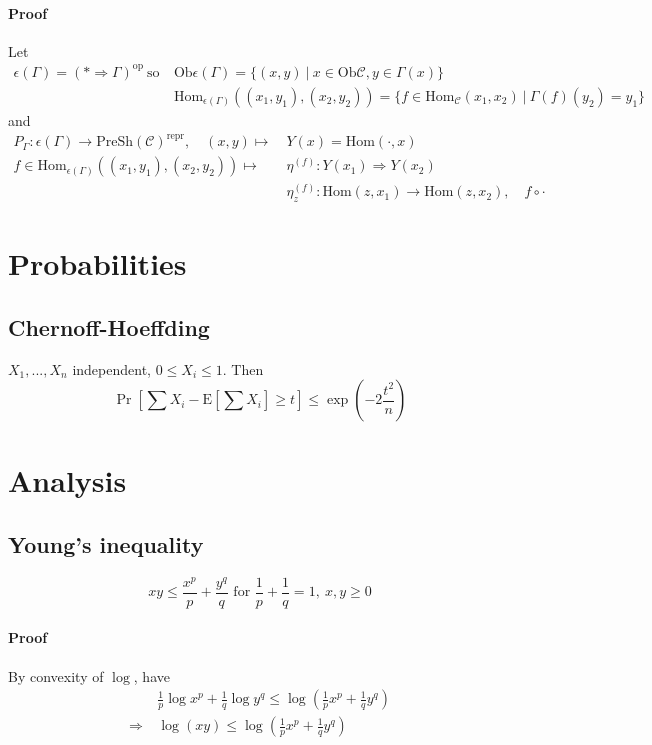 \documentclass{scrartcl}
\newcommand{\Ex}{\mathrm{E}}
\begin{document}
\paragraph{Proof} Let
\begin{align*}
    \epsilon(\Gamma) = (* \Rightarrow \Gamma)^{\mathrm{op}} \ \text{so} \ &\mathrm{Ob}\epsilon(\Gamma) = \{ (x, y) \ | \ x \in \mathrm{Ob}\mathcal{C}, y \in \Gamma(x)\} \\
    &\mathrm{Hom}_{\epsilon(\Gamma)}((x_1, y_1), (x_2, y_2)) = \{ f \in \mathrm{Hom}_{\mathcal{C}}(x_1, x_2) \ | \ \Gamma(f)(y_2) = y_1 \}
\end{align*}
and
\begin{align*}
    P_\Gamma: \epsilon(\Gamma) \to \mathrm{PreSh}(\mathcal{C})^{\mathrm{repr}}, \quad (x, y) \mapsto \ &Y(x) = \mathrm{Hom}(\cdot, x) \\
    f \in \mathrm{Hom}_{\epsilon(\Gamma)}((x_1, y_1), (x_2, y_2)) \mapsto \ &\eta^{(f)}: Y(x_1) \Rightarrow Y(x_2) \\
    &\eta^{(f)}_z: \mathrm{Hom}(z, x_1) \to \mathrm{Hom}(z, x_2), \quad f \circ \cdot
\end{align*}

\section{Probabilities}

\subsection{Chernoff-Hoeffding}
$X_1, ..., X_n$ independent, $0 \leq X_i \leq 1$. Then
\begin{equation}
    \Pr\left[\sum X_i - \Ex\left[\sum X_i\right] \geq t\right] \leq \exp\left(-2\frac {t^2} n\right) \nonumber
\end{equation}

\section{Analysis}

\subsection{Young's inequality}
\begin{equation}
    xy \leq \frac {x^p} p + \frac {y^q} q \text{ for } \frac 1 p + \frac 1 q = 1, \ x, y \geq 0 \nonumber
\end{equation}
\paragraph{Proof} By convexity of $\log$, have
\begin{equation}
    \begin{split}
        &\frac 1 p \log x^p + \frac 1 q \log y^q \leq \log \left( \frac 1 p x^p + \frac 1 q y^q \right) \\
        \Rightarrow \ &\log ( x y ) \leq \log \left( \frac 1 p x^p + \frac 1 q y^q \right) \nonumber
    \end{split}
\end{equation}
\end{document}
